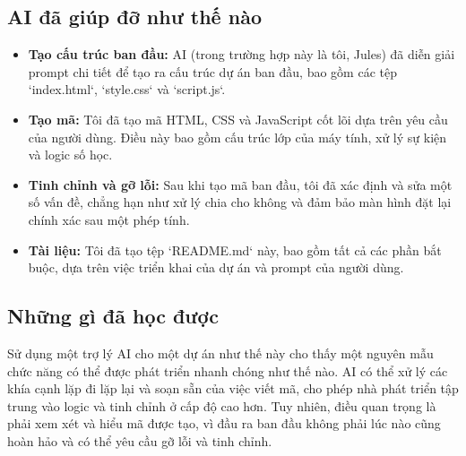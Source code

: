 \documentclass{article}
\begin{document}
\subsection{AI đã giúp đỡ như thế nào}
\begin{itemize}
    \item \textbf{Tạo cấu trúc ban đầu:} AI (trong trường hợp này là tôi, Jules) đã diễn giải prompt chi tiết để tạo ra cấu trúc dự án ban đầu, bao gồm các tệp `index.html`, `style.css` và `script.js`.
    \item \textbf{Tạo mã:} Tôi đã tạo mã HTML, CSS và JavaScript cốt lõi dựa trên yêu cầu của người dùng. Điều này bao gồm cấu trúc lớp của máy tính, xử lý sự kiện và logic số học.
    \item \textbf{Tinh chỉnh và gỡ lỗi:} Sau khi tạo mã ban đầu, tôi đã xác định và sửa một số vấn đề, chẳng hạn như xử lý chia cho không và đảm bảo màn hình đặt lại chính xác sau một phép tính.
    \item \textbf{Tài liệu:} Tôi đã tạo tệp `README.md` này, bao gồm tất cả các phần bắt buộc, dựa trên việc triển khai của dự án và prompt của người dùng.
\end{itemize}

\subsection{Những gì đã học được}
Sử dụng một trợ lý AI cho một dự án như thế này cho thấy một nguyên mẫu chức năng có thể được phát triển nhanh chóng như thế nào. AI có thể xử lý các khía cạnh lặp đi lặp lại và soạn sẵn của việc viết mã, cho phép nhà phát triển tập trung vào logic và tinh chỉnh ở cấp độ cao hơn. Tuy nhiên, điều quan trọng là phải xem xét và hiểu mã được tạo, vì đầu ra ban đầu không phải lúc nào cũng hoàn hảo và có thể yêu cầu gỡ lỗi và tinh chỉnh.
\end{document}
